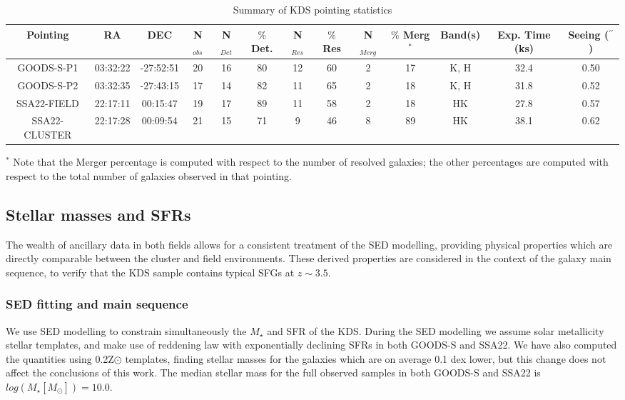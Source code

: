 \documentclass[fleqn,usenatbib]{mn2e}
\begin{document}
\begin{table*}
\centering
\begin{threeparttable}
\caption{Summary of KDS pointing statistics}
\label{tab:pointings}
\begin{tabular}{c c c c c c c c c c c c c}

 \hline
Pointing & RA & DEC & N$_{obs}$ & N$_{Det}$ & $\%$ Det. & N$_{Res}$ & $\%$ Res & N$_{Merg}$ & $\%$ Merg$^{*}$ & Band(s) & Exp. Time (ks) & Seeing ($^{\prime\prime}$)  \\
 \hline
 GOODS-S-P1 & 03:32:22 & -27:52:51 & 20 & 16 & 80 & 12 & 60 & 2 & 17 & K, H & 32.4 & 0.50 \\
GOODS-S-P2 & 03:32:35 & -27:43:15 & 17 & 14 & 82 & 11 & 65 & 2 & 18 & K, H & 31.8 & 0.52 \\
SSA22-FIELD & 22:17:11 & 00:15:47 & 19 & 17 & 89 & 11 & 58 & 2 & 18 & HK & 27.8 & 0.57 \\
SSA22-CLUSTER & 22:17:28 & 00:09:54 & 21 & 15 & 71 & 9 & 46 & 8 & 89 & HK & 38.1 & 0.62 \\
 \hline
\end{tabular}
\begin{tablenotes}
      \small
      \item $^{*}$ Note that the Merger percentage is computed with respect to the number of resolved galaxies; the other percentages are computed with respect to the total number of galaxies observed in that pointing.
    \end{tablenotes}
  \end{threeparttable}
  \end{table*}

\subsection{Stellar masses and SFRs}\label{subsec:stellar_masses_and_sfrs}
The wealth of ancillary data in both fields allows for a consistent treatment of the SED modelling, providing physical properties which are directly comparable between the cluster and field environments.
These derived properties are considered in the context of the galaxy main sequence, to verify that the KDS sample contains typical SFGs at $z\sim3.5$.   

\subsubsection{SED fitting and main sequence}\label{subsubsec:sed_fitting}
We use SED modelling to constrain simultaneously the $M_{\star}$ and SFR of the KDS.
During the SED modelling we assume solar metallicity stellar templates, and make use of \cite{Calzetti2000} reddening law with exponentially declining SFRs in both GOODS-S and SSA22.
We have also computed the quantities using 0.2Z$\odot$ templates, finding stellar masses for the galaxies which are on average 0.1 dex lower, but this change does not affect the conclusions of this work.
The median stellar mass for the full observed samples in both GOODS-S and SSA22 is $log(M_{\star}[M_{\odot}]) = 10.0$.
\end{document}
